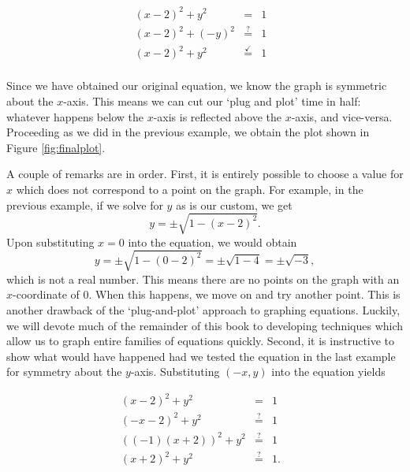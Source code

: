{\[ \begin{array}{rclr}   

(x-2)^2 + y^2 & = & 1 & \\ 
(x-2)^2 + (-y)^2 & \stackrel{?}{=} & 1 & \\ 
(x-2)^2 + y^2 & \stackrel{\checkmark}{=} & 1 & \\

\end{array} \]

Since we have obtained our original equation, we know the graph is symmetric about the $x$-axis.  This means we can cut our `plug and plot' time in half:  whatever happens below the $x$-axis is reflected above the $x$-axis, and vice-versa.  Proceeding as we did in the previous example, we obtain the plot shown in Figure \ref{fig:finalplot}.

}

A couple of remarks are in order.  First, it is entirely possible to choose a value for $x$ which does not correspond to a point on the graph.  For example, in the previous example, if we solve for $y$ as is our custom, we get
\[y = \pm \sqrt{1-(x-2)^2}.\]
Upon substituting $x=0$ into the equation, we would obtain
\[y = \pm \sqrt{1 - (0-2)^2} = \pm \sqrt{1 - 4} = \pm \sqrt{-3},\]
which is not a real number.  This means there are no points on the graph with an $x$-coordinate of $0$.  When this happens, we move on and try another point.  This is another drawback of the `plug-and-plot' approach to graphing equations.  Luckily, we will devote much of the remainder of this book to developing techniques which allow us to graph entire families of equations quickly.  Second, it is instructive to show what would have happened had we tested the equation in the last example for symmetry about the $y$-axis.  Substituting $(-x,y)$ into the equation yields

\[ \begin{array}{rclr}  

(x-2)^2 + y^2 & = & 1 & \\
(-x-2)^2 + y^2 & \stackrel{?}{=} & 1 & \\
((-1)(x+2))^2 + y^2 & \stackrel{?}{=} & 1 & \\
(x+2)^2 + y^2 & \stackrel{?}{=} & 1. & \\

\end{array} \]

